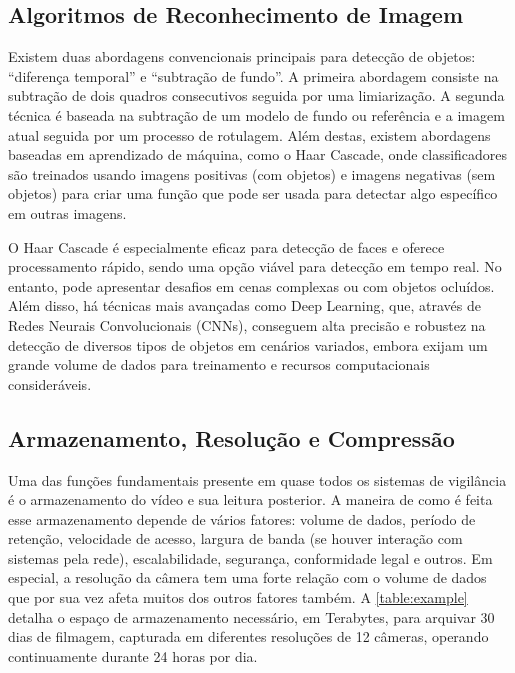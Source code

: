 \documentclass[12pt, %
openright, 
oneside, %
a4paper,    %
brazil]{facom-ufu-abntex2}
\begin{document}
\subsection{Algoritmos de Reconhecimento de Imagem}

Existem duas abordagens convencionais principais para detecção de objetos:
``diferença temporal'' e ``subtração de fundo''. A primeira abordagem consiste
na subtração de dois quadros consecutivos seguida por uma limiarização. A
segunda técnica é baseada na subtração de um modelo de fundo ou referência e a
imagem atual seguida por um processo de rotulagem. Além destas, existem
abordagens baseadas em aprendizado de máquina, como o Haar Cascade, onde
classificadores são treinados usando imagens positivas (com objetos) e imagens
negativas (sem objetos) para criar uma função que pode ser usada para detectar
algo específico em outras imagens. \cite{Valera2005IntelligentDS31}

O Haar Cascade é especialmente eficaz para detecção de faces e oferece
processamento rápido, sendo uma opção viável para detecção em tempo real. No
entanto, pode apresentar desafios em cenas complexas ou com objetos ocluídos.
Além disso, há técnicas mais avançadas como Deep Learning, que, através de
Redes Neurais Convolucionais (CNNs), conseguem alta precisão e robustez na
detecção de diversos tipos de objetos em cenários variados, embora exijam um
grande volume de dados para treinamento e recursos computacionais
consideráveis. \cite{MLKHaarCascade2021}

\subsection{Armazenamento, Resolução e Compressão}

Uma das funções fundamentais presente em quase todos os sistemas de vigilância
é o armazenamento do vídeo e sua leitura posterior. A maneira de como é feita
esse armazenamento depende de vários fatores: volume de dados, período de
retenção, velocidade de acesso, largura de banda (se houver interação com
sistemas pela rede), escalabilidade, segurança, conformidade legal e outros. Em
especial, a resolução da câmera tem uma forte relação com o volume de dados que
por sua vez afeta muitos dos outros fatores também. A \autoref{table:example}
detalha o espaço de armazenamento necessário, em Terabytes, para arquivar 30
dias de filmagem, capturada em diferentes resoluções de 12 câmeras, operando
continuamente durante 24 horas por dia.  %
\end{document}
